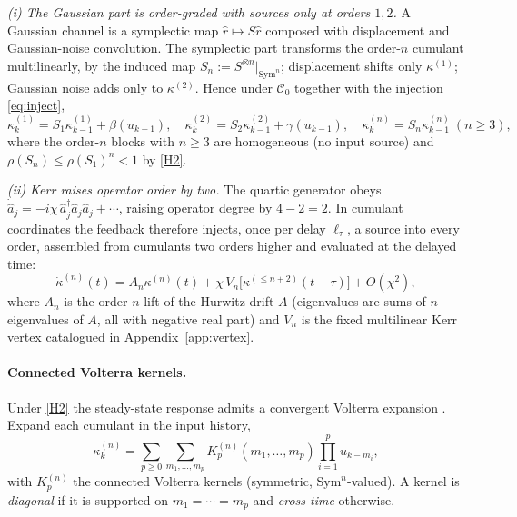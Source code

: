 \documentclass[11pt]{article}
\theoremstyle{remark}
\newcommand{\rhat}{\hat{r}}
\newcommand{\ahat}{\hat{a}}
\newcommand{\Sym}{\mathrm{Sym}}
\newcommand{\Cz}{\mathcal{C}_0}
\begin{document}
\emph{(i) The Gaussian part is order-graded with sources only at orders $1,2$.}
A Gaussian channel is a symplectic map $\rhat\mapsto S\rhat$ composed with
displacement and Gaussian-noise convolution. The symplectic part transforms the
order-$n$ cumulant multilinearly, by the induced map
$S_n:=S^{\otimes n}\big|_{\Sym^n}$; displacement shifts only $\kappa^{(1)}$;
Gaussian noise adds only to $\kappa^{(2)}$. Hence under $\Cz$ together with the
injection \eqref{eq:inject},
\begin{equation}
\kappa^{(1)}_k = S_1\kappa^{(1)}_{k-1}+\beta(u_{k-1}),\quad
\kappa^{(2)}_k = S_2\kappa^{(2)}_{k-1}+\gamma(u_{k-1}),\quad
\kappa^{(n)}_k = S_n\kappa^{(n)}_{k-1}\ (n\ge3),
\label{eq:gauss-rec}
\end{equation}
where the order-$n$ blocks with $n\ge3$ are homogeneous (no input source) and
$\rho(S_n)\le\rho(S_1)^n<1$ by \ref{H2}.

\emph{(ii) Kerr raises operator order by two.} The quartic generator obeys
$\dot{\ahat}_j=-i\chi\,\ahat_j^\dagger\ahat_j\ahat_j+\cdots$, raising operator
degree by $4-2=2$. In cumulant coordinates the feedback therefore injects, once
per delay $\ell_\tau$, a source into every order, assembled from cumulants two
orders higher and evaluated at the delayed time:
\begin{equation}
\dot\kappa^{(n)}(t) = A_n\kappa^{(n)}(t)
+ \chi\,V_n\!\big[\kappa^{(\le n+2)}(t-\tau)\big] + O(\chi^2),
\label{eq:kerr-rec}
\end{equation}
where $A_n$ is the order-$n$ lift of the Hurwitz drift $A$ (eigenvalues are sums
of $n$ eigenvalues of $A$, all with negative real part) and $V_n$ is the fixed
multilinear Kerr vertex catalogued in Appendix~\ref{app:vertex}.

\paragraph{Connected Volterra kernels.}
Under \ref{H2} the steady-state response admits a convergent Volterra expansion
\cite{boyd1985,cuchiero2021}. Expand each cumulant in the input history,
\begin{equation}
\kappa^{(n)}_k = \sum_{p\ge0}\sum_{m_1,\dots,m_p}
K^{(n)}_p(m_1,\dots,m_p)\prod_{i=1}^p u_{k-m_i},
\label{eq:volterra}
\end{equation}
with $K^{(n)}_p$ the connected Volterra kernels (symmetric, $\Sym^n$-valued). A
kernel is \emph{diagonal} if it is supported on $m_1=\cdots=m_p$ and
\emph{cross-time} otherwise.
\end{document}
